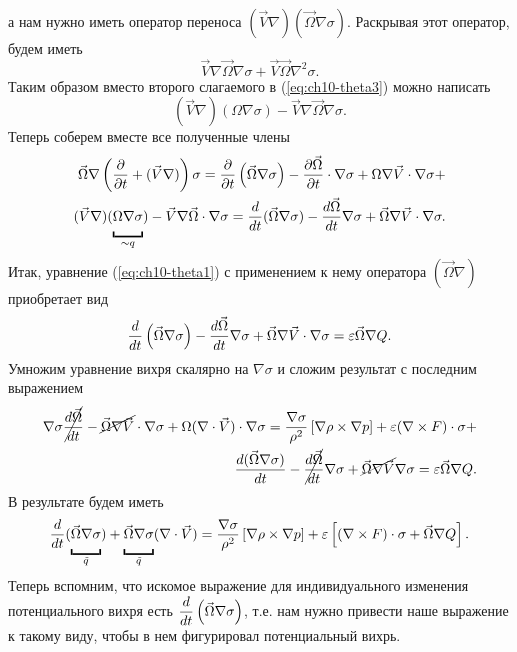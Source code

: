 а нам нужно иметь оператор переноса $(\vec{V}\nabla)(\vec{\Omega}\nabla\sigma)$. Раскрывая этот оператор, будем иметь
\begin{equation*}
    \vec{V}\nabla\vec{\Omega}\nabla\sigma + \vec{V}\vec{\Omega}\nabla^2\sigma.
\end{equation*}
Таким образом вместо второго слагаемого в (\ref{eq:ch10-theta3}) можно написать
\begin{equation*}
    (\vec{V}\nabla) (\Omega\nabla\sigma) - \vec{V}\nabla\vec{\Omega}\nabla\sigma.
\end{equation*}
Теперь соберем вместе все полученные члены
\begin{align*} 
    \vec{\Omega}\nabla \rb{ \pd{}{t} + (\vec{V}\nabla) }\sigma = 
    \pd{}{t} \rb{\vec{\Omega}\nabla\sigma} - 
    \pd{\vec{\Omega}}{t}\cdot\nabla\sigma + 
    \Omega\nabla\vec{V}\cdot\nabla\sigma + \\
    (\vec{V}\nabla) (\ub{\vphantom{\td{}{t}}\Omega\nabla\sigma}_{\sim q}) - 
    \vec{V}\nabla\vec{\Omega}\cdot\nabla\sigma =  
    \td{}{t}(\vec{\Omega}\nabla\sigma) - 
    \td{\vec{\Omega}}{t}\nabla\sigma + 
    \vec{\Omega}\nabla\vec{V}\cdot\nabla\sigma.
\end{align*}
Итак, уравнение (\ref{eq:ch10-theta1}) с применением к нему оператора $(\vec{\Omega}\nabla)$ приобретает вид
\begin{equation}
    \label{eq:ch10-theta4}
    \displaystyle\frac{d }{d t} \displaystyle \left(  \vec{\Omega}\nabla\sigma  \right) - 
    \displaystyle\frac{d \vec{\Omega}}{d t}\nabla\sigma + 
    \vec{\Omega}\nabla\vec{V}\cdot\nabla\sigma = 
    \varepsilon\vec{\Omega}\nabla Q.
\end{equation}
Умножим уравнение вихря скалярно на $\nabla\sigma$ и сложим результат с последним выражением
\begin{align*}
    \nabla\sigma \cancel{ \displaystyle\frac{d \vec{\Omega}}{d t} } - 
    \cancel{  \vec{\Omega}\nabla\vec{V} } \cdot\nabla\sigma + 
    \Omega(\nabla\cdot\vec{V})\cdot\nabla\sigma =  
    \frac{\nabla\sigma}{\rho^2} \displaystyle \left[  \nabla\rho \times \nabla p  \right] + 
    \varepsilon (\nabla\times F) \cdot\sigma + \\
    \displaystyle\frac{d (\vec{\Omega}\nabla\sigma)}{d t} - 
    \cancel{ \displaystyle\frac{d \vec{\Omega}}{d t} } \nabla\sigma + 
    \cancel{ \vec{\Omega}\nabla\vec{V}} \nabla\sigma =  
    \varepsilon\vec{\Omega}\nabla Q.
\end{align*}
В результате будем иметь
\begin{equation}
    \label{eq:ch10-theta5}
    \td{}{t} ( \ub{\vphantom{\td{}{t}}\vec{\Omega}\nabla\sigma}_{\Tilde{q}} ) + 
    \ub{\vphantom{\td{}{t}}\vec{\Omega}\nabla\sigma}_{\Tilde{q}}(\nabla\cdot\vec{V}) = 
    \frac{\nabla\sigma}{\rho^2} \qb{ \nabla\rho\times\nabla p } + 
    \varepsilon \qb{ (\nabla\times F)\cdot\sigma + \vec{\Omega}\nabla Q }.
\end{equation}
Теперь вспомним, что искомое выражение для индивидуального изменения потенциального вихря есть $\displaystyle\frac{d }{d t} \displaystyle \left( \vec{\Omega}\nabla\sigma \right) $, т.е. нам нужно привести наше выражение к такому виду, чтобы в нем фигурировал потенциальный вихрь.

